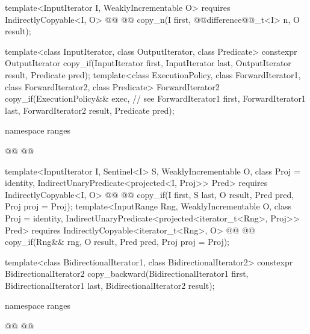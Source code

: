 \begin{addedblock}
\begin{codeblock}
{    template<InputIterator I, WeaklyIncrementable O>
      requires IndirectlyCopyable<I, O>
      @@
      @@
        copy_n(I first, @@difference@@_t<I> n, O result);
  }
\end{codeblock}\end{addedblock}\begin{codeblock}
  template<class InputIterator, class OutputIterator, class Predicate>
    constexpr OutputIterator copy_if(InputIterator first, InputIterator last,
                                     OutputIterator result, Predicate pred);
  template<class ExecutionPolicy, class ForwardIterator1, class ForwardIterator2,
           class Predicate>
    ForwardIterator2 copy_if(ExecutionPolicy&& exec, // see 
                             ForwardIterator1 first, ForwardIterator1 last,
                             ForwardIterator2 result, Predicate pred);
\end{codeblock}\begin{addedblock}\begin{codeblock}
  namespace ranges {
    @@
    @@

    template<InputIterator I, Sentinel<I> S, WeaklyIncrementable O, class Proj = identity,
        IndirectUnaryPredicate<projected<I, Proj>> Pred>
      requires IndirectlyCopyable<I, O>
      @@
      @@
        copy_if(I first, S last, O result, Pred pred, Proj proj = Proj{});
    template<InputRange Rng, WeaklyIncrementable O, class Proj = identity,
        IndirectUnaryPredicate<projected<iterator_t<Rng>, Proj>> Pred>
      requires IndirectlyCopyable<iterator_t<Rng>, O>
      @@
      @@
        copy_if(Rng&& rng, O result, Pred pred, Proj proj = Proj{});
  }
\end{codeblock}\end{addedblock}\begin{codeblock}
  template<class BidirectionalIterator1, class BidirectionalIterator2>
    constexpr BidirectionalIterator2
      copy_backward(BidirectionalIterator1 first, BidirectionalIterator1 last,
                    BidirectionalIterator2 result);
\end{codeblock}\begin{addedblock}\begin{codeblock}
  namespace ranges {
    @@
    @@

}
\end{codeblock}
\end{addedblock}
